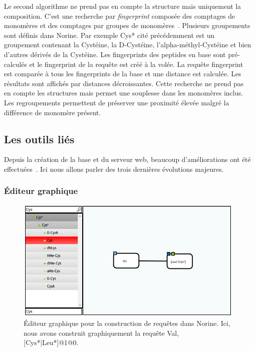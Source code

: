 Le second algorithme ne prend pas en compte la structure mais uniquement la composition.
C'est une recherche par \textit{fingerprint} composée des comptages de monomères et des comptages par groupes de monomères~\cite{abdo_new_2012}.
Plusieurs groupements sont définis dans Norine.
Par exemple Cys* cité précédemment est un groupement contenant la Cystéine, la D-Cystéine, l'alpha-méthyl-Cystéine et bien d'autres dérivés de la Cystéine.
Les fingerprints des peptides en base sont pré-calculés et le fingerprint de la requête est créé à la volée.
La requête fingerprint est comparée à tous les fingerprints de la base et une distance est calculée.
Les résultats sont affichés par distances décroissantes.
Cette recherche ne prend pas en compte les structures mais permet une souplesse dans les monomères inclus.
Les regroupements permettent de préserver une proximité élevée malgré la différence de monomère présent.



\subsection{Les outils liés}

Depuis la création de la base et du serveur web, beaucoup d'améliorations ont été effectuées~\cite{flissi_norine_2016}.
Ici nous allons parler des trois dernières évolutions majeures.


\subsubsection{Éditeur graphique}

\begin{figure}[h!]
  \begin{center}
    \includegraphics[width=450px]{Figures/Norine/editor.png}
    \caption{\label{editor}Éditeur graphique pour la construction de requêtes dans Norine.
    Ici, nous avons construit graphiquement la requête Val,[Cys*|Leu*]@1@0.}
  \end{center}
\end{figure}

